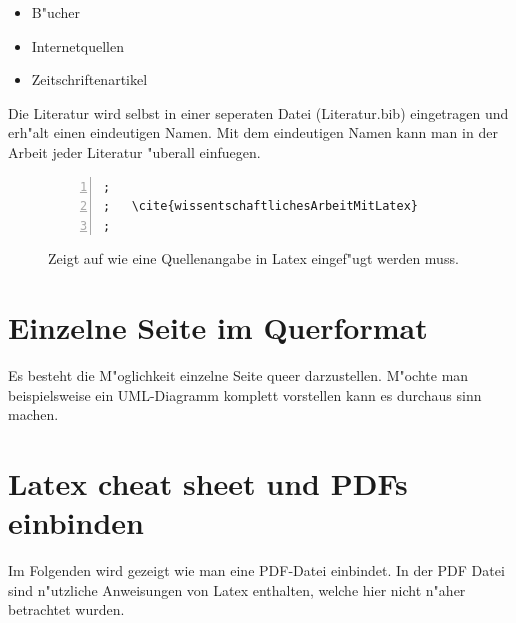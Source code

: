 \begin{itemize}
\item B"ucher\cite{wissentschaftlichesArbeitMitLatex}
\item Internetquellen\cite{zitieren13a}
\item Zeitschriftenartikel
\end{itemize}

Die Literatur wird selbst in einer seperaten Datei (Literatur.bib) eingetragen und erh"alt einen eindeutigen Namen. Mit dem eindeutigen Namen kann man in der Arbeit jeder Literatur "uberall einfuegen. 


\FloatBarrier
\begin{figure}[htb]
\begin{lstlisting}[backgroundcolor={\color{white}},
basicstyle={\normalsize\sffamily},
breaklines=true,
frame={bottomline,topline, rightline},
language=HTML,
numbers=left,
showstringspaces=false,
xleftmargin=22pt]	
;
;	\cite{wissentschaftlichesArbeitMitLatex}
;           
\end{lstlisting}
  \caption[Beschreibt wie man eine Literaturenquelle einbindet.]{Zeigt auf wie eine Quellenangabe in Latex eingef"ugt werden muss.}
\label{lst:literaturenquelle}
\end{figure}


\begin{landscape}


\section{Einzelne Seite im Querformat}
\label{sec:Querformat}


Es besteht die M"oglichkeit einzelne Seite queer darzustellen. M"ochte man beispielsweise ein UML-Diagramm komplett vorstellen kann es durchaus sinn machen.

\section{Latex cheat sheet und PDFs einbinden}
\label{sec:cheatsheet}

Im Folgenden wird gezeigt wie man eine PDF-Datei einbindet. In der PDF Datei sind n"utzliche Anweisungen von Latex enthalten, welche hier nicht n"aher betrachtet wurden.

\end{landscape}

 



\cleardoublepage
